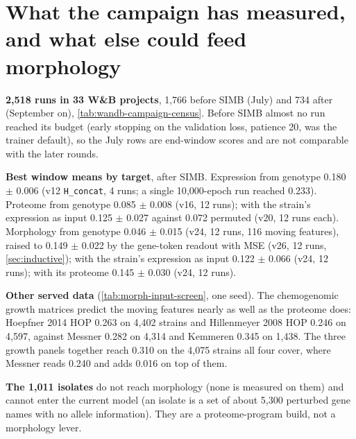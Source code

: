 
\section{What the campaign has measured, and what else could feed morphology}
\label{sec:data-review}

\begin{keybox}
\textbf{2{,}518 runs in 33 W\&B projects}, 1{,}766 before SIMB (July) and 734 after
(September on), \cref{tab:wandb-campaign-census}. Before SIMB almost no run reached its
budget (early stopping on the validation loss, patience 20, was the trainer default), so the
July rows are end-window scores and are not comparable with the later rounds.

\textbf{Best window means by target}, after SIMB. Expression from genotype 0.180 $\pm$ 0.006
(v12 \texttt{H\_concat}, 4 runs; a single 10{,}000-epoch run reached 0.233). Proteome from
genotype 0.085 $\pm$ 0.008 (v16, 12 runs); with the strain's expression as input 0.125 $\pm$
0.027 against 0.072 permuted (v20, 12 runs each). Morphology from genotype 0.046 $\pm$ 0.015
(v24, 12 runs, 116 moving features), raised to 0.149 $\pm$ 0.022 by the gene-token readout
with MSE (v26, 12 runs, \cref{sec:inductive}); with the strain's expression as input 0.122
$\pm$ 0.066 (v24, 12 runs); with its proteome 0.145 $\pm$ 0.030 (v24, 12 runs).

\textbf{Other served data} (\cref{tab:morph-input-screen}, one seed). The chemogenomic
growth matrices predict the moving features nearly as well as the proteome does: Hoepfner
2014 HOP 0.263 on 4{,}402 strains and Hillenmeyer 2008 HOP 0.246 on 4{,}597, against Messner
0.282 on 4{,}314 and Kemmeren 0.345 on 1{,}438. The three growth panels together reach 0.310
on the 4{,}075 strains all four cover, where Messner reads 0.240 and adds 0.016 on top of
them.

\textbf{The 1{,}011 isolates} do not reach morphology (none is measured on them) and cannot
enter the current model (an isolate is a set of about 5{,}300 perturbed gene names with no
allele information). They are a proteome-program build, not a morphology lever.
\end{keybox}

